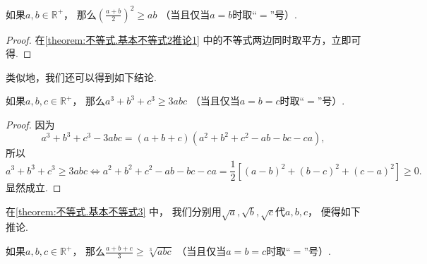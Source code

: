 \begin{corollary}\label{theorem:不等式.基本不等式2推论2}
如果\(a,b\in\mathbb{R}^+\)，
那么\(\left(\frac{a+b}2\right)^2 \geq ab\)
（当且仅当\(a=b\)时取“\(=\)”号）.
\begin{proof}
在\cref{theorem:不等式.基本不等式2推论1} 中的不等式两边同时取平方，立即可得.
\end{proof}
\end{corollary}

类似地，我们还可以得到如下结论.
\begin{theorem}\label{theorem:不等式.基本不等式3}
如果\(a,b,c\in\mathbb{R}^+\)，
那么\(a^3 + b^3 + c^3 \geq 3abc\)
（当且仅当\(a=b=c\)时取“\(=\)”号）.
\begin{proof}
因为\[
	a^3+b^3+c^3-3abc
	= (a+b+c)(a^2+b^2+c^2-ab-bc-ca),
\]
所以\[
	a^3 + b^3 + c^3 \geq 3abc
	\iff
	a^2+b^2+c^2-ab-bc-ca
	= \frac12 \left[
		(a-b)^2+(b-c)^2+(c-a)^2
	\right]
	\geq 0.
\]
显然成立.
\end{proof}
\end{theorem}

在\cref{theorem:不等式.基本不等式3} 中，
我们分别用\(\sqrt{a},\sqrt{b},\sqrt{c}\)代\(a,b,c\)，
便得如下推论.
\begin{corollary}\label{theorem:不等式.基本不等式3推论}
如果\(a,b,c\in\mathbb{R}^+\)，
那么\(\frac{a+b+c}{3} \geq \sqrt[3]{abc}\)
（当且仅当\(a=b=c\)时取“\(=\)”号）.
\end{corollary}

